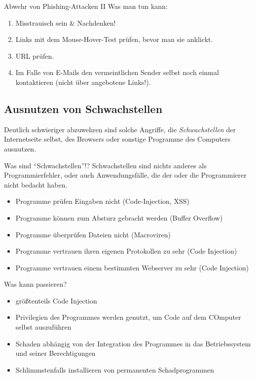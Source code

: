 \documentclass[hyperref={colorlinks,linkcolor=white}, utf8]{beamer}
\begin{document}
	\begin{frame}{Abwehr von Phishing-Attacken II}
		\alert{Was man tun kann:}
		\begin{enumerate}
			\item Misstrauisch sein \& Nachdenken!
			\item Links mit dem Mouse-Hover-Test prüfen, bevor man sie anklickt.
			\item URL prüfen.
			\item Im Falle von E-Mails den vermeintlichen Sender selbst noch einmal kontaktieren (nicht über angebotene Links!).
		\end{enumerate}
	\end{frame}
	
	\subsection{Ausnutzen von Schwachstellen}
	\begin{frame}
		Deutlich schwieriger abzuwehren sind solche Angriffe, die \emph{Schwachstellen} der Internetseite selbst, des Browsers oder sonstige Programme des Computers ausnutzen.
	\end{frame}

	\begin{frame}
		\begin{block}{Was sind \enquote{Schwachstellen}!?}
			Schwachstellen sind nichts anderes als Programmierfehler, oder auch Anwendungsfälle, die der oder die Programmierer nicht bedacht haben.
		\end{block}
		
		\begin{itemize}
			\item Programme prüfen Eingaben nicht (Code-Injection, XSS)
			\item Programme können zum Absturz gebracht werden (Buffer Overflow)
			\item Programme überprüfen Dateien nicht (Macroviren)
			\item Programme vertrauen ihren eigenen Protokollen zu sehr (Code Injection)
			\item Programme vertrauen einem bestimmten Webserver zu sehr (Code Injection)
		\end{itemize}
	\end{frame}

	\begin{frame}{Was kann passieren?}
		\begin{itemize}
			\item größtenteils Code Injection
			\item Privilegien des Programmes werden genutzt, um Code auf dem COmputer selbst auszuführen
			\item Schaden abhängig von der Integration des Programmes in das Betriebssystem und seiner Berechtigungen
			\item Schlimmstenfalls installieren von permanenten Schadprogrammen
		\end{itemize}
	\end{frame}
\end{document}
